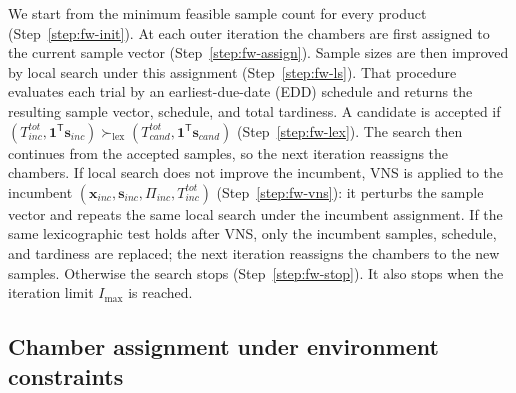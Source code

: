 \documentclass[11pt]{article}
\begin{document}
We start from the minimum feasible sample count for every product
(Step~\ref{step:fw-init}).
At each outer iteration the chambers are first assigned to the
current sample vector (Step~\ref{step:fw-assign}).
Sample sizes are then improved by local search under this assignment
(Step~\ref{step:fw-ls}).
That procedure evaluates each trial by an earliest-due-date (EDD)
schedule and returns the resulting sample vector, schedule, and total
tardiness.
A candidate is accepted if
\((T^{tot}_{inc},\mathbf{1}^{\mathsf{T}}\mathbf{s}_{inc})\succ_{\mathrm{lex}}(T^{tot}_{cand},\mathbf{1}^{\mathsf{T}}\mathbf{s}_{cand})\)
(Step~\ref{step:fw-lex}).
The search then continues from the accepted samples, so the next
iteration reassigns the chambers.
If local search does not improve the incumbent, VNS is applied to
the incumbent
\((\mathbf{x}_{inc},\mathbf{s}_{inc},\Pi_{inc},T^{tot}_{inc})\)
(Step~\ref{step:fw-vns}): it perturbs the sample vector and repeats
the same local search under the incumbent assignment.
If the same lexicographic test holds after VNS, only the incumbent
samples, schedule, and tardiness are replaced; the next iteration
reassigns the chambers to the new samples.
Otherwise the search stops (Step~\ref{step:fw-stop}).
It also stops when the iteration limit \(I_{\max}\) is reached.

\subsection{Chamber assignment under environment constraints}
\label{subsec:chamber_assignment}
\end{document}
